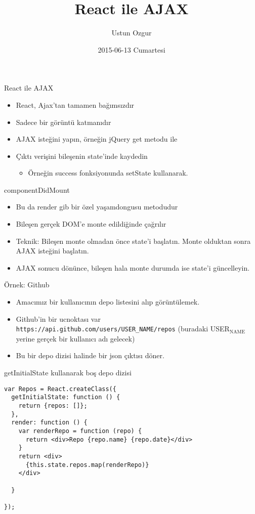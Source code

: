 \documentclass[presentation]{beamer}
\author{Ustun Ozgur}
\date{2015-06-13 Cumartesi}
\title{React ile AJAX}
\begin{document}
\maketitle

\begin{frame}[label=sec-1]{React ile AJAX}
\begin{itemize}
\item React, Ajax'tan tamamen bağımsızdır
\item Sadece bir görüntü katmanıdır
\item AJAX isteğini yapın, örneğin jQuery get metodu ile
\item Çıktı verişini bileşenin state'inde kaydedin
\begin{itemize}
\item Örneğin success fonksiyonunda setState kullanarak.
\end{itemize}
\end{itemize}
\end{frame}

\begin{frame}[label=sec-2]{componentDidMount}
\begin{itemize}
\item Bu da render gib bir özel yaşamdongusu metodudur
\item Bileşen gerçek DOM'e monte edildiğinde çağrılır
\item Teknik: Bileşen monte olmadan önce state'i başlatın. Monte olduktan sonra
AJAX isteğini başlatın.
\item AJAX sonucu dönünce, bileşen hala monte durumda ise state'i güncelleyin.
\end{itemize}
\end{frame}

\begin{frame}[fragile,label=sec-3]{Örnek: Github}
 \begin{itemize}
\item Amacımız bir kullanıcının depo listesini alıp görüntülemek.
\item Github'in bir ucnoktası var \texttt{https://api.github.com/users/USER\_NAME/repos}
  (buradaki USER$_{\text{NAME}}$ yerine gerçek bir kullanıcı adı gelecek)
\item Bu bir depo dizisi halinde bir json çıktısı döner.
\end{itemize}
\end{frame}

\begin{frame}[fragile,label=sec-4]{getInitialState kullanarak boş depo dizisi}
 \begin{verbatim}
var Repos = React.createClass({
  getInitialState: function () {
    return {repos: []};
  },
  render: function () {
    var renderRepo = function (repo) {
      return <div>Repo {repo.name} {repo.date}</div>
    }
    return <div>
      {this.state.repos.map(renderRepo)}
    </div>

  }

});
\end{verbatim}
\end{frame}
\end{document}
